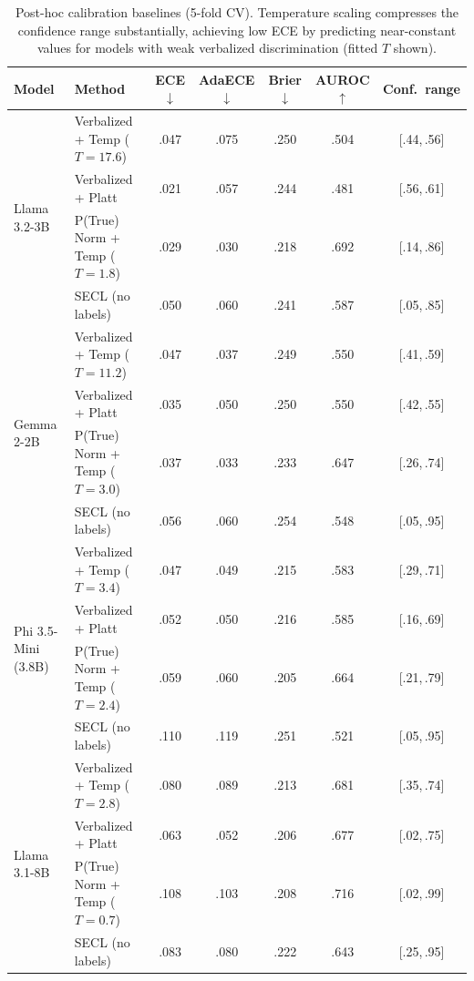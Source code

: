 \begin{table}[htbp]
\centering
\footnotesize
\begin{tabular}{llccccc}
\toprule
\textbf{Model} & \textbf{Method}
  & \textbf{ECE}$\downarrow$ & \textbf{AdaECE}$\downarrow$
  & \textbf{Brier}$\downarrow$ & \textbf{AUROC}$\uparrow$ 
  & \textbf{Conf.\ range} \\
\midrule
\multirow{4}{*}{Llama 3.2-3B}
  & Verbalized + Temp ($T{=}17.6$)  & .047 & .075 & .250 & .504 & [.44,\,.56] \\
  & Verbalized + Platt              & .021 & .057 & .244 & .481 & [.56,\,.61] \\
  & P(True) Norm + Temp ($T{=}1.8$)  & .029 & .030 & .218 & .692 & [.14,\,.86] \\
  & SECL (no labels)        & .050 & .060 & .241 & .587 & [.05,\,.85] \\
\midrule
\multirow{4}{*}{Gemma 2-2B}
  & Verbalized + Temp ($T{=}11.2$)  & .047 & .037 & .249 & .550 & [.41,\,.59] \\
  & Verbalized + Platt              & .035 & .050 & .250 & .550 & [.42,\,.55] \\
  & P(True) Norm + Temp ($T{=}3.0$)  & .037 & .033 & .233 & .647 & [.26,\,.74] \\
  & SECL (no labels)        & .056 & .060 & .254 & .548 & [.05,\,.95] \\
\midrule
\multirow{4}{*}{Phi 3.5-Mini (3.8B)}
  & Verbalized + Temp ($T{=}3.4$)   & .047 & .049 & .215 & .583 & [.29,\,.71] \\
  & Verbalized + Platt              & .052 & .050 & .216 & .585 & [.16,\,.69] \\
  & P(True) Norm + Temp ($T{=}2.4$)  & .059 & .060 & .205 & .664 & [.21,\,.79] \\
  & SECL (no labels)        & .110 & .119 & .251 & .521 & [.05,\,.95] \\
\midrule
\multirow{4}{*}{Llama 3.1-8B}
  & Verbalized + Temp ($T{=}2.8$)   & .080 & .089 & .213 & .681 & [.35,\,.74] \\
  & Verbalized + Platt              & .063 & .052 & .206 & .677 & [.02,\,.75] \\
  & P(True) Norm + Temp ($T{=}0.7$)  & .108 & .103 & .208 & .716 & [.02,\,.99] \\
  & SECL (no labels)        & .083 & .080 & .222 & .643 & [.25,\,.95] \\
\bottomrule
\end{tabular}
\caption{Post-hoc calibration baselines (5-fold CV). 
Temperature scaling compresses the confidence range substantially,
achieving low ECE by predicting near-constant values for models with
weak verbalized discrimination (fitted $T$ shown).}
\label{tab:posthoc}
\end{table}

